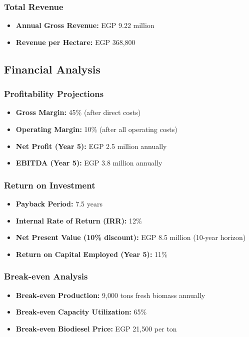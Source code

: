 \subsubsection{Total Revenue}
\begin{itemize}
    \item \textbf{Annual Gross Revenue:} EGP 9.22 million
    \item \textbf{Revenue per Hectare:} EGP 368,800
\end{itemize}

\subsection{Financial Analysis}

\subsubsection{Profitability Projections}
\begin{itemize}
    \item \textbf{Gross Margin:} 45\% (after direct costs)
    \item \textbf{Operating Margin:} 10\% (after all operating costs)
    \item \textbf{Net Profit (Year 5):} EGP 2.5 million annually
    \item \textbf{EBITDA (Year 5):} EGP 3.8 million annually
\end{itemize}

\subsubsection{Return on Investment}
\begin{itemize}
    \item \textbf{Payback Period:} 7.5 years
    \item \textbf{Internal Rate of Return (IRR):} 12\%
    \item \textbf{Net Present Value (10\% discount):} EGP 8.5 million (10-year horizon)
    \item \textbf{Return on Capital Employed (Year 5):} 11\%
\end{itemize}

\subsubsection{Break-even Analysis}
\begin{itemize}
    \item \textbf{Break-even Production:} 9,000 tons fresh biomass annually
    \item \textbf{Break-even Capacity Utilization:} 65\%
    \item \textbf{Break-even Biodiesel Price:} EGP 21,500 per ton
\end{itemize}

